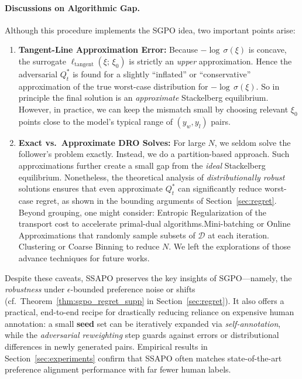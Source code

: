 \paragraph{Discussions on Algorithmic Gap.}
Although this procedure implements the SGPO idea, two important points arise:
\begin{enumerate}
\item \textbf{Tangent-Line Approximation Error:} Because $-\!\log\,\sigma(\xi)$ is concave, the surrogate $\ell_{\mathrm{tangent}}(\xi;\,\xi_0)$ is strictly an \emph{upper} approximation.  Hence the adversarial $Q^*_t$ is found for a slightly “inflated” or “conservative” approximation of the true worst-case distribution for $-\!\log\,\sigma(\xi)$.  So in principle the final solution is an \emph{approximate} Stackelberg equilibrium.  However, in practice, we can keep the mismatch small by choosing relevant $\xi_0$ points close to the model’s typical range of $(y_w,y_l)$ pairs. 
 
\item \textbf{Exact vs.\ Approximate DRO Solves:}  For large $N$, we seldom solve the follower’s problem exactly.  Instead, we do a partition-based approach.  Such approximations further create a small gap from the \emph{ideal} Stackelberg equilibrium.  Nonetheless, the theoretical analysis of \emph{distributionally robust} solutions ensures that even approximate $Q^*_t$ can significantly reduce worst-case regret, as shown in the bounding arguments of Section~\ref{sec:regret}. Beyond grouping, one might consider: Entropic Regularization \citep{Cuturi2013Sinkhorn} of the transport cost to
      accelerate primal-dual algorithms.Mini-batching or Online Approximations \citep{Blanchet2019quantifying} that randomly sample subsets of $\mathcal{D}$ at each iteration. Clustering or Coarse Binning \citep{Khezeli2019,Gao2022distributionally} to
      reduce $N$. We left the explorations of those advance techniques for future works.
\end{enumerate}

Despite these caveats, SSAPO preserves the key insights of SGPO---namely, the \emph{robustness} under $\epsilon$-bounded preference noise or shifts (cf.\ Theorem~\ref{thm:sgpo_regret_supp} in Section~\ref{sec:regret}).  It also offers a practical, end-to-end recipe for drastically reducing reliance on expensive human annotation: a small \textbf{seed} set can be iteratively expanded via \emph{self-annotation}, while the \emph{adversarial reweighting} step guards against errors or distributional differences in newly generated pairs.  Empirical results in Section~\ref{sec:experiments} confirm that SSAPO often matches state-of-the-art preference alignment performance with far fewer human labels.

